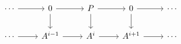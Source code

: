 \documentclass[12pt]{standalone}
\begin{document}
        $$

\begin{tikzcd}
    \cdots \ar[r] & 0 \ar[r] \ar[d] & P \ar[r] \ar[d] & 0 \ar[r] \ar[d] & \cdots \\
    \cdots \ar[r] & A^{i-1} \ar[r] & A^i \ar[r] & A^{i+1} \ar[r] & \cdots 
\end{tikzcd}
        $$
        
\end{document}
